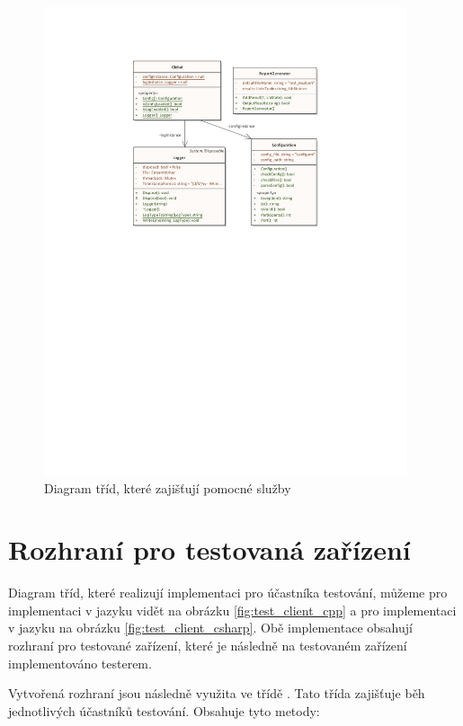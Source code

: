 \begin{figure}[H]
    \centering 
    \includegraphics[width=0.95\textwidth]{assets/img/class_diagram/utility.pdf}
    \caption{Diagram tříd, které zajišťují pomocné služby}
    \label{fig:utility}
\end{figure}


\section{Rozhraní pro testovaná zařízení}\label{sec:testrunner}

Diagram tříd, které realizují implementaci pro účastníka testování, můžeme pro implementaci v jazyku \cpp{} vidět na obrázku \ref{fig:test_client_cpp} a pro implementaci v jazyku \csharp{} na obrázku \ref{fig:test_client_csharp}. Obě implementace obsahují rozhraní pro testované zařízení, které je následně na testovaném zařízení implementováno testerem.

Vytvořená rozhraní jsou následně využita ve třídě . Tato třída zajišťuje běh jednotlivých účastníků testování. Obsahuje tyto metody: 

